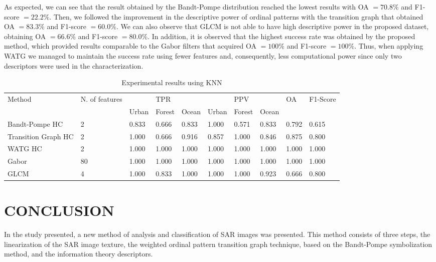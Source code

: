 \documentclass[journal]{IEEEtran}
\begin{document}
	As expected, we can see that the result obtained by the Bandt-Pompe distribution reached the lowest results with OA $= 70.8\%$ and F1-score $= 22.2\%$.
	Then, we followed the improvement in the descriptive power of ordinal patterns with the transition graph that obtained OA $= 83.3\%$ and F1-score $= 60.0\%$.
	We can also observe that GLCM is not able to have high descriptive power in the proposed dataset, obtaining OA $= 66.6\%$ and F1-score $= 80.0\%$.
	In addition, it is observed that the highest success rate was obtained by the proposed method, which provided results comparable to the Gabor filters that acquired OA $= 100\%$ and F1-score $= 100\%$.
	Thus, when applying WATG we managed to maintain the success rate using fewer features and, consequently, less computational power since only two descriptors were used in the characterization.
	
	\begin{table}[hbt]
		\centering
		\caption{Experimental results using KNN}
		\label{tab:result1}
		\begin{tabular}{|l|l|lll|lll|l|l|}
			\hline
			Method      & N. of features         &       & TPR   &       &       & PPV    &       & OA  & F1-Score \\ \cline{3-8} 
			&   & Urban & Forest & Ocean & Urban & Forest & Ocean & &  \\\hline
			Bandt-Pompe HC   & 2 & 0.833 &  0.666  & 0.833 & 1.000 & 0.571  & 0.833 & 0.792 &  0.615  \\ 
			Transition Graph HC & 2  & 1.000 & 0.666  & 0.916 & 0.857 & 1.000  & 0.846 & 0.875 & 0.800 \\
			WATG HC         & 2  & 1.000 & 1.000  & 1.000 & 1.000 & 1.000  & 1.000 & 1.000 & 1.000 \\ 
			Gabor           & 80  & 1.000 & 1.000  & 1.000 & 1.000 & 1.000  & 1.000 & 1.000 & 1.000\\
			GLCM            & 4   & 1.000 & 0.833  & 1.000 & 1.000 & 1.000  & 0.923 & 0.666 & 0.800\\
			\hline
		\end{tabular}
	\end{table}
	
	\section{CONCLUSION}\label{Conclusion}
	
	In the study presented, a new method of analysis and classification of SAR images was presented.
	This method consists of three steps, the linearization of the SAR image texture, the weighted ordinal pattern transition graph technique, based on the Bandt-Pompe symbolization method, and the information theory descriptors.
	
\end{document}
